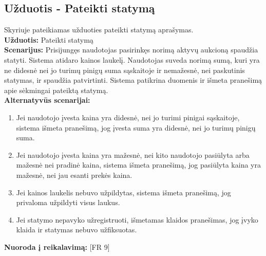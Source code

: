 \documentclass{VUMIFPSkursinis}
\begin{document}
	\subsection{Užduotis - Pateikti statymą}
	Skyriuje pateikiamas užduoties pateikti statymą aprašymas.\\
	\textbf{Užduotis:}  Pateikti statymą \\
	\textbf{Scenarijus:}  Prisijungęs naudotojas pasirinkęs norimą aktyvų aukcioną spaudžia statyti. Sistema atidaro kainos laukelį. Naudotojas suveda norimą sumą, kuri yra ne didesnė nei jo turimų pinigų suma sąskaitoje ir nemažesnė, nei paskutinis statymas, ir spaudžia patvirtinti. Sistema patikrina duomenis ir išmeta pranešimą apie sėkmingai pateiktą statymą. \\
	\textbf{Alternatyvūs scenarijai:}
	\begin{enumerate}
		\item Jei naudotojo įvesta kaina yra didesnė, nei jo turimi pinigai sąskaitoje, sistema išmeta pranešimą, jog įvesta suma yra didesnė, nei jo turimų pinigų suma. 
		\item Jei naudotojo įvesta kaina yra mažesnė, nei kito naudotojo pasiūlyta arba mažesnė nei pradinė kaina, sistema išmeta pranešimą, jog pasiūlyta kaina yra mažesnė, nei jau esanti prekės kaina. 
		\item Jei kainos laukelis nebuvo užpildytas, sistema išmeta pranešimą, jog privaloma užpildyti visus laukus. 
		\item Jei statymo nepavyko užregistruoti, išmetamas klaidos pranešimas, jog įvyko klaida ir statymas nebuvo užfiksuotas. 
	\end{enumerate}
	\textbf{Nuoroda į reikalavimą: } [FR 9]
	
\end{document}
